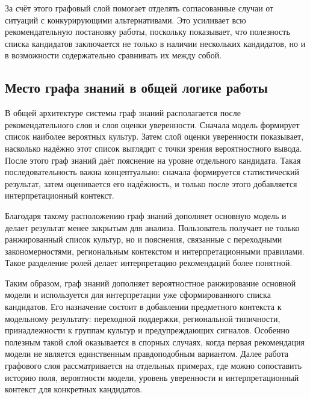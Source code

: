 За счёт этого графовый слой помогает отделять согласованные случаи
от ситуаций с конкурирующими альтернативами.
Это усиливает всю рекомендательную постановку работы, поскольку показывает, что
полезность списка кандидатов заключается не только в наличии нескольких кандидатов,
но и в возможности содержательно сравнивать их между собой.

\subsection{Место графа знаний в общей логике работы}

В общей архитектуре системы граф знаний располагается после рекомендательного слоя
и слоя оценки уверенности. Сначала модель формирует список наиболее вероятных культур.
Затем слой оценки уверенности показывает, насколько надёжно этот список выглядит
с точки зрения вероятностного вывода. После этого граф знаний даёт пояснение на
уровне отдельного кандидата. Такая последовательность важна концептуально: сначала
формируется статистический результат, затем оценивается его надёжность, и только
после этого добавляется интерпретационный контекст.

Благодаря такому расположению граф знаний дополняет основную модель и делает результат
менее закрытым для анализа. Пользователь получает не только ранжированный список культур,
но и пояснения, связанные с переходными закономерностями, региональным контекстом и интерпретационными правилами.
Такое разделение ролей делает интерпретацию рекомендаций более понятной.

Таким образом, граф знаний дополняет вероятностное ранжирование основной модели
и используется для интерпретации уже сформированного списка кандидатов. Его
назначение состоит в добавлении предметного контекста к модельному результату:
переходной поддержки, региональной типичности, принадлежности к группам культур
и предупреждающих сигналов. Особенно полезным такой слой оказывается в спорных
случаях, когда первая рекомендация модели не является единственным правдоподобным
вариантом. Далее работа графового слоя рассматривается на отдельных примерах,
где можно сопоставить историю поля, вероятности модели, уровень уверенности и
интерпретационный контекст для конкретных кандидатов.
